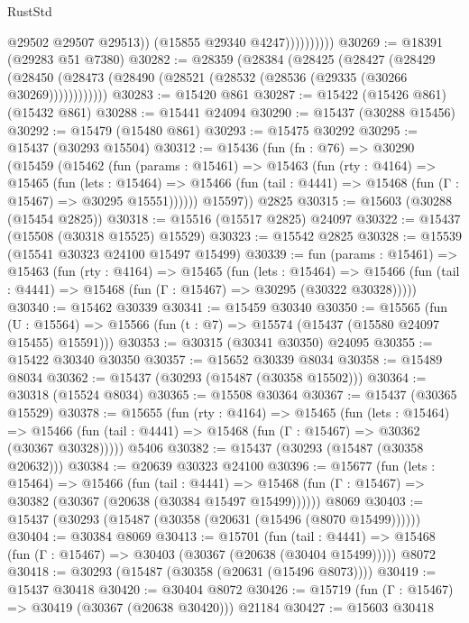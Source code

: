 \begin{lexlean}{RustStd}
\begin{coremodule}
                          @29502
                          @29507
                          @29513))
                      (@15855 @29340 @4247))))))))))
@30269 := @18391 (@29283 @51 @7380)
@30282 := @28359
    (@28384
      (@28425
        (@28427
          (@28429 (@28450 (@28473 (@28490 (@28521 (@28532 (@28536 (@29335 (@30266 @30269))))))))))))
@30283 := @15420 @861
@30287 := @15422 (@15426 @861) (@15432 @861)
@30288 := @15441 @24094
@30290 := @15437 (@30288 @15456)
@30292 := @15479 (@15480 @861)
@30293 := @15475 @30292
@30295 := @15437 (@30293 @15504)
@30312 := @15436
    (fun (fn : @76) =>
    @30290
      (@15459
        (@15462
          (fun (params : @15461) =>
          @15463
            (fun (rty : @4164) =>
            @15465
              (fun (lets : @15464) =>
              @15466 (fun (tail : @4441) => @15468 (fun (Γ : @15467) => @30295 @15551))))))
        @15597))
    @2825
@30315 := @15603 (@30288 (@15454 @2825))
@30318 := @15516 (@15517 @2825) @24097
@30322 := @15437 (@15508 (@30318 @15525) @15529)
@30323 := @15542 @2825
@30328 := @15539 (@15541 @30323 @24100 @15497 @15499)
@30339 := fun (params : @15461) =>
  @15463
    (fun (rty : @4164) =>
    @15465
      (fun (lets : @15464) =>
      @15466 (fun (tail : @4441) => @15468 (fun (Γ : @15467) => @30295 (@30322 @30328)))))
@30340 := @15462 @30339
@30341 := @15459 @30340
@30350 := @15565
    (fun (U : @15564) => @15566 (fun (t : @7) => @15574 (@15437 (@15580 @24097 @15455) @15591)))
@30353 := @30315 (@30341 @30350) @24095
@30355 := @15422 @30340 @30350
@30357 := @15652 @30339 @8034
@30358 := @15489 @8034
@30362 := @15437 (@30293 (@15487 (@30358 @15502)))
@30364 := @30318 (@15524 @8034)
@30365 := @15508 @30364
@30367 := @15437 (@30365 @15529)
@30378 := @15655
    (fun (rty : @4164) =>
    @15465
      (fun (lets : @15464) =>
      @15466 (fun (tail : @4441) => @15468 (fun (Γ : @15467) => @30362 (@30367 @30328)))))
    @5406
@30382 := @15437 (@30293 (@15487 (@30358 @20632)))
@30384 := @20639 @30323 @24100
@30396 := @15677
    (fun (lets : @15464) =>
    @15466
      (fun (tail : @4441) =>
      @15468 (fun (Γ : @15467) => @30382 (@30367 (@20638 (@30384 @15497 @15499))))))
    @8069
@30403 := @15437 (@30293 (@15487 (@30358 (@20631 (@15496 (@8070 @15499))))))
@30404 := @30384 @8069
@30413 := @15701
    (fun (tail : @4441) => @15468 (fun (Γ : @15467) => @30403 (@30367 (@20638 (@30404 @15499)))))
    @8072
@30418 := @30293 (@15487 (@30358 (@20631 (@15496 @8073))))
@30419 := @15437 @30418
@30420 := @30404 @8072
@30426 := @15719 (fun (Γ : @15467) => @30419 (@30367 (@20638 @30420))) @21184
@30427 := @15603 @30418

\end{coremodule}
\end{lexlean}
